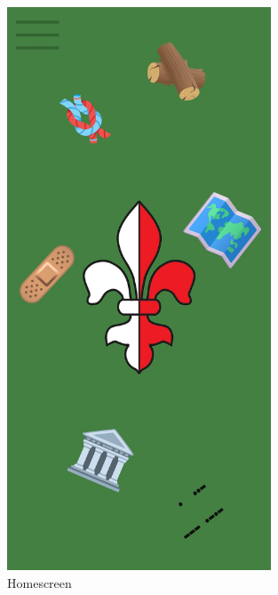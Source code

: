 \begin{figure}[!hp]
    \centering
    \begin{minipage}[b]{0.4\textwidth}
        \centering
        \includegraphics[width=0.7\textwidth]{Picture/homescreen.jpg}
        \caption{Homescreen}
        \label{fig:homescreen}
    \end{minipage}
    \begin{minipage}[b]{0.4\textwidth}
        \centering

\end{minipage}
\end{figure}
